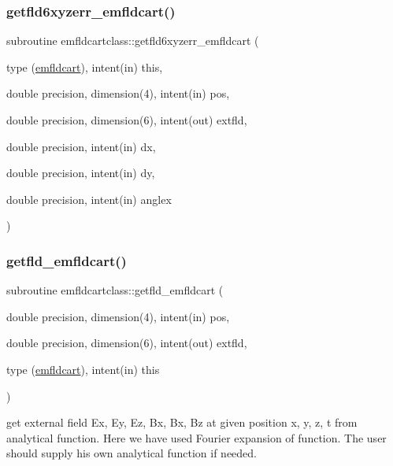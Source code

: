 \subsubsection{\texorpdfstring{getfld6xyzerr\_emfldcart()}{getfld6xyzerr\_emfldcart()}}
{\footnotesize\ttfamily subroutine emfldcartclass\+::getfld6xyzerr\+\_\+emfldcart (\begin{DoxyParamCaption}\item[{type (\mbox{\hyperlink{namespaceemfldcartclass_structemfldcartclass_1_1emfldcart}{emfldcart}}), intent(in)}]{this,  }\item[{double precision, dimension(4), intent(in)}]{pos,  }\item[{double precision, dimension(6), intent(out)}]{extfld,  }\item[{double precision, intent(in)}]{dx,  }\item[{double precision, intent(in)}]{dy,  }\item[{double precision, intent(in)}]{anglex }\end{DoxyParamCaption})}

\mbox{\label{namespaceemfldcartclass_a77a88279f5b3f9878199cf20d7e4c5a5}} 
\subsubsection{\texorpdfstring{getfld\_emfldcart()}{getfld\_emfldcart()}}
{\footnotesize\ttfamily subroutine emfldcartclass\+::getfld\+\_\+emfldcart (\begin{DoxyParamCaption}\item[{double precision, dimension(4), intent(in)}]{pos,  }\item[{double precision, dimension(6), intent(out)}]{extfld,  }\item[{type (\mbox{\hyperlink{namespaceemfldcartclass_structemfldcartclass_1_1emfldcart}{emfldcart}}), intent(in)}]{this }\end{DoxyParamCaption})}



get external field Ex, Ey, Ez, Bx, Bx, Bz at given position x, y, z, t from analytical function. Here we have used Fourier expansion of function. The user should supply his own analytical function if needed. 

